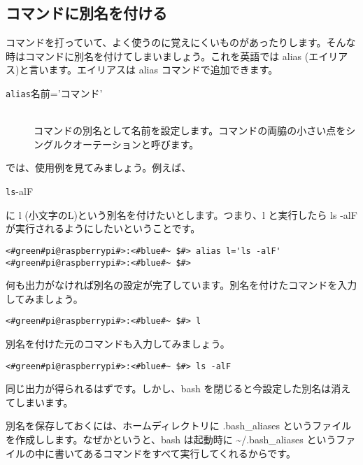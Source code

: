 \subsection{コマンドに別名を付ける}

コマンドを打っていて、よく使うのに覚えにくいものがあったりします。そんな時はコマンドに別名を付けてしまいましょう。これを英語では alias (エイリアス)と言います。エイリアスは alias コマンドで追加できます。

\begin{description}
\item[\texttt{alias}\textvisiblespace 名前='コマンド']\mbox{}\\
コマンドの別名として名前を設定します。コマンドの両脇の小さい点をシングルクオーテーションと呼びます。
\end{description}

では、使用例を見てみましょう。例えば、

\begin{description}
\item[\texttt{ls}\textvisiblespace -alF]
\end{description}

に l (小文字のL)という別名を付けたいとします。つまり、l と実行したら ls -alF が実行されるようにしたいということです。

\begin{lstlisting}[caption=aliasコマンドの例, label=aliasCommandExample]
<#green#pi@raspberrypi#>:<#blue#~ $#> alias l='ls -alF'
<#green#pi@raspberrypi#>:<#blue#~ $#>
\end{lstlisting}

何も出力がなければ別名の設定が完了しています。別名を付けたコマンドを入力してみましょう。

\begin{lstlisting}[caption=別名の確認, label=confirmAlias]
<#green#pi@raspberrypi#>:<#blue#~ $#> l
\end{lstlisting}

別名を付けた元のコマンドも入力してみましょう。

\begin{lstlisting}[caption=元のコマンドの確認, label=confirmCommand]
<#green#pi@raspberrypi#>:<#blue#~ $#> ls -alF
\end{lstlisting}

同じ出力が得られるはずです。しかし、bash を閉じると今設定した別名は消えてしまいます。

別名を保存しておくには、ホームディレクトリに .bash{\_}aliases というファイルを作成しします。なぜかというと、bash は起動時に \textasciitilde/.bash{\_}aliases というファイルの中に書いてあるコマンドをすべて実行してくれるからです。

